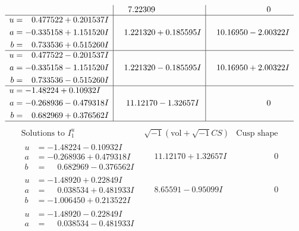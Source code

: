 \documentclass[1p]{elsarticle_modified}
\theoremstyle{definition}
\newcommand{\I}{\sqrt{-1}}
\begin{document}
$$\begin{array}{c|c|c}
 & \phantom{-}7.22309\phantom{ +0.000000I} & \phantom{-0.000000 } 0 \\ \hline\begin{aligned}
u &= \phantom{-}0.477522 + 0.201537 I \\
a &= -0.335158 + 1.151520 I \\
b &= \phantom{-}0.733536 + 0.515260 I\end{aligned}
 & \phantom{-}1.221320 + 0.185595 I & \phantom{-}10.16950 - 2.00322 I \\ \hline\begin{aligned}
u &= \phantom{-}0.477522 - 0.201537 I \\
a &= -0.335158 - 1.151520 I \\
b &= \phantom{-}0.733536 - 0.515260 I\end{aligned}
 & \phantom{-}1.221320 - 0.185595 I & \phantom{-}10.16950 + 2.00322 I \\ \hline\begin{aligned}
u &= -1.48224 + 0.10932 I \\
a &= -0.268936 - 0.479318 I \\
b &= \phantom{-}0.682969 + 0.376562 I\end{aligned}
 & \phantom{-}11.12170 - 1.32657 I & \phantom{-0.000000 } 0\\
 \hline 
 \end{array}$$\newpage$$\begin{array}{c|c|c}  
\text{Solutions to }I^u_{1}& \I (\text{vol} + \sqrt{-1}CS) & \text{Cusp shape}\\
 \hline 
\begin{aligned}
u &= -1.48224 - 0.10932 I \\
a &= -0.268936 + 0.479318 I \\
b &= \phantom{-}0.682969 - 0.376562 I\end{aligned}
 & \phantom{-}11.12170 + 1.32657 I & \phantom{-0.000000 } 0 \\ \hline\begin{aligned}
u &= -1.48920 + 0.22849 I \\
a &= \phantom{-}0.038534 + 0.481933 I \\
b &= -1.006450 + 0.213522 I\end{aligned}
 & \phantom{-}8.65591 - 0.95099 I & \phantom{-0.000000 } 0 \\ \hline\begin{aligned}
u &= -1.48920 - 0.22849 I \\
a &= \phantom{-}0.038534 - 0.481933 I \\

\end{aligned}
\end{array}$$
\end{document}
